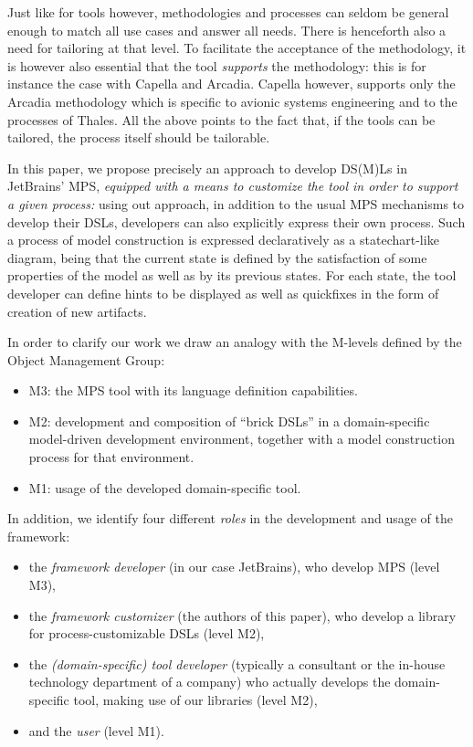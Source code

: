 Just like for tools however, methodologies and processes can seldom be general enough to match 
all use cases and answer all needs. There is henceforth also a need for tailoring at
that level. To facilitate the acceptance of the methodology, it is however also essential
that the tool \emph{supports} the methodology: this is for instance the case
with Capella and Arcadia.
Capella however, supports only the Arcadia methodology which
is specific to avionic systems engineering and to the processes of Thales.
All the above points to the fact that, if the tools can be tailored, the process
itself should be tailorable.

In this paper, we propose precisely an approach to develop DS(M)Ls in JetBrains'
MPS, \emph{equipped with a means to customize the tool in order to support a
given process:} using out approach, in addition to the usual MPS mechanisms to
develop their DSLs, developers can also explicitly express their own process.
Such a process of model construction is expressed declaratively as a
statechart-like diagram, being that the current state is defined by the
satisfaction of some properties of the model as well as by its previous states.
For each state, the tool developer can define hints to be displayed as well as
quickfixes in the form of creation of new artifacts.

In order to clarify our work we draw an analogy with the M-levels defined by the Object Management Group:
\begin{itemize}
  \item M3: the MPS tool with its language definition capabilities.
  \item M2: development and composition of ``brick DSLs'' in a
  domain-specific model-driven development environment, together with a
  model construction process for that environment.
  \item M1: usage of the developed domain-specific tool.
\end{itemize}
In addition, we identify four different \emph{roles} in the development and
usage of the framework:
\begin{itemize}
  \item the \emph{framework developer} (in our case JetBrains), who develop MPS
  (level M3),
  \item the \emph{framework customizer} (the authors of this paper), who develop
  a library for process-customizable DSLs (level M2),
  \item the \emph{(domain-specific) tool developer} 
    (typically a consultant or the in-house technology department of a company)
    who actually develops the domain-specific tool, making use of our libraries (level M2),
  \item and the \emph{user} (level M1).
\end{itemize}


